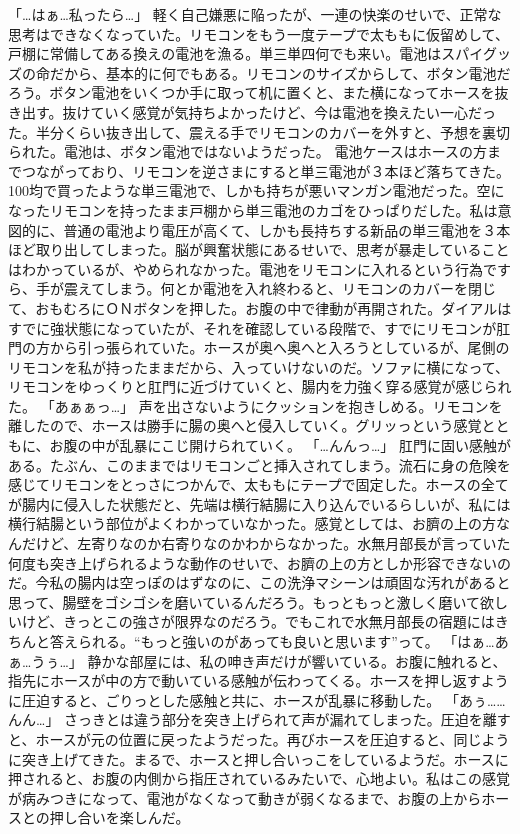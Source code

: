 「…はぁ…私ったら…」
軽く自己嫌悪に陥ったが、一連の快楽のせいで、正常な思考はできなくなっていた。リモコンをもう一度テープで太ももに仮留めして、戸棚に常備してある換えの電池を漁る。単三単四何でも来い。電池はスパイグッズの命だから、基本的に何でもある。リモコンのサイズからして、ボタン電池だろう。ボタン電池をいくつか手に取って机に置くと、また横になってホースを抜き出す。抜けていく感覚が気持ちよかったけど、今は電池を換えたい一心だった。半分くらい抜き出して、震える手でリモコンのカバーを外すと、予想を裏切られた。電池は、ボタン電池ではないようだった。
電池ケースはホースの方までつながっており、リモコンを逆さまにすると単三電池が３本ほど落ちてきた。100均で買ったような単三電池で、しかも持ちが悪いマンガン電池だった。空になったリモコンを持ったまま戸棚から単三電池のカゴをひっぱりだした。私は意図的に、普通の電池より電圧が高くて、しかも長持ちする新品の単三電池を３本ほど取り出してしまった。脳が興奮状態にあるせいで、思考が暴走していることはわかっているが、やめられなかった。電池をリモコンに入れるという行為ですら、手が震えてしまう。何とか電池を入れ終わると、リモコンのカバーを閉じて、おもむろにＯＮボタンを押した。お腹の中で律動が再開された。ダイアルはすでに強状態になっていたが、それを確認している段階で、すでにリモコンが肛門の方から引っ張られていた。ホースが奥へ奥へと入ろうとしているが、尾側のリモコンを私が持ったままだから、入っていけないのだ。ソファに横になって、リモコンをゆっくりと肛門に近づけていくと、腸内を力強く穿る感覚が感じられた。
「あぁぁっ…」
声を出さないようにクッションを抱きしめる。リモコンを離したので、ホースは勝手に腸の奥へと侵入していく。グリッっという感覚とともに、お腹の中が乱暴にこじ開けられていく。
「…んんっ…」
肛門に固い感触がある。たぶん、このままではリモコンごと挿入されてしまう。流石に身の危険を感じてリモコンをとっさにつかんで、太ももにテープで固定した。ホースの全てが腸内に侵入した状態だと、先端は横行結腸に入り込んでいるらしいが、私には横行結腸という部位がよくわかっていなかった。感覚としては、お臍の上の方なんだけど、左寄りなのか右寄りなのかわからなかった。水無月部長が言っていた何度も突き上げられるような動作のせいで、お臍の上の方としか形容できないのだ。今私の腸内は空っぽのはずなのに、この洗浄マシーンは頑固な汚れがあると思って、腸壁をゴシゴシを磨いているんだろう。もっともっと激しく磨いて欲しいけど、きっとこの強さが限界なのだろう。でもこれで水無月部長の宿題にはきちんと答えられる。“もっと強いのがあっても良いと思います”って。
「はぁ…あぁ…うぅ…」
静かな部屋には、私の呻き声だけが響いている。お腹に触れると、指先にホースが中の方で動いている感触が伝わってくる。ホースを押し返すように圧迫すると、ごりっとした感触と共に、ホースが乱暴に移動した。
「あぅ……んん…」
さっきとは違う部分を突き上げられて声が漏れてしまった。圧迫を離すと、ホースが元の位置に戻ったようだった。再びホースを圧迫すると、同じように突き上げてきた。まるで、ホースと押し合いっこをしているようだ。ホースに押されると、お腹の内側から指圧されているみたいで、心地よい。私はこの感覚が病みつきになって、電池がなくなって動きが弱くなるまで、お腹の上からホースとの押し合いを楽しんだ。

